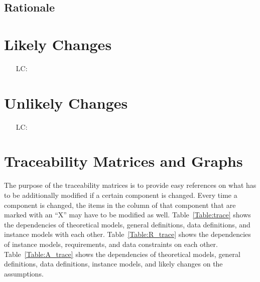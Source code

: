 \documentclass[12pt]{article}
\newcounter{lcnum} %
\begin{document}
\subsection{Rationale}


\section{Likely Changes}

\noindent \begin{itemize}

  \item[LC\refstepcounter{lcnum}\thelcnum\label{LC_meaningfulLabel}:] 

\end{itemize}

\section{Unlikely Changes}

\noindent \begin{itemize}

  \item[LC\refstepcounter{lcnum}\thelcnum\label{LC_meaningfulLabel}:] 

\end{itemize}

\section{Traceability Matrices and Graphs}

The purpose of the traceability matrices is to provide easy references on what
has to be additionally modified if a certain component is changed. Every time a
component is changed, the items in the column of that component that are marked
with an ``X'' may have to be modified as well. Table~\ref{Table:trace} shows
the dependencies of theoretical models, general definitions, data definitions,
and instance models with each other. Table~\ref{Table:R_trace} shows the
dependencies of instance models, requirements, and data constraints on each
other. Table~\ref{Table:A_trace} shows the dependencies of theoretical models,
general definitions, data definitions, instance models, and likely changes on
the assumptions.
\end{document}
